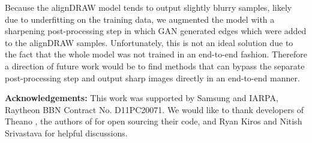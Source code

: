 \documentclass{article} %
\begin{document}
Because the alignDRAW model tends to output slightly blurry samples, likely due to underfitting on the training data, we augmented the model with a sharpening post-processing step in which GAN generated edges which were added to the alignDRAW samples. Unfortunately, this is not an ideal solution due to the fact that the whole model was not trained in an end-to-end fashion. Therefore a direction of future work would be to find methods that can bypass the separate post-processing step and output sharp images directly in an end-to-end manner. 

{\small
{\bf Acknowledgements:}
This work was supported by Samsung and IARPA, Raytheon BBN Contract No. D11PC20071.
We would like to thank developers of Theano \citep{theano}, the authors of \citep{denton_lapgan} for open sourcing their code, and Ryan Kiros and Nitish Srivastava for helpful discussions. 
}

{\small


}

\newpage
\appendix

\end{document}
